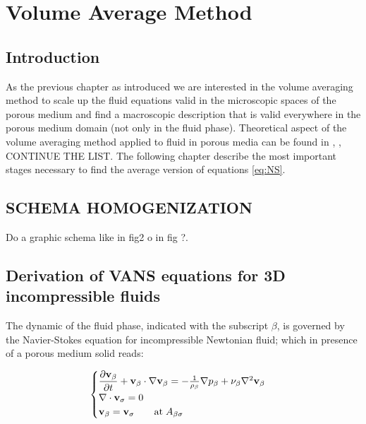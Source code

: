 \chapter{Volume Average Method}
\label{ch:vans}


\section{Introduction}

As the previous chapter as introduced we are interested in the volume averaging method to scale up the fluid equations valid in the microscopic spaces of the porous medium and find a macroscopic description that is valid everywhere in the porous medium domain (not only in the fluid phase).
Theoretical aspect of the volume averaging method applied to fluid in porous media can be found in \citet{whitaker2013method}, \citet{whitaker1986flow}, \citet{whitaker1996forchheimer} CONTINUE THE LIST.
The following chapter describe the most important stages necessary to find the average version of equations \eqref{eq:NS}.

\section{SCHEMA HOMOGENIZATION}
Do a graphic schema like in \citet{paez2017macroscopic} fig2 o in \citet{davit2013homogenization} fig ?.


\section{Derivation of VANS equations for 3D incompressible fluids}
The dynamic of the fluid phase, indicated with the subscript $\beta$, is governed by the Navier-Stokes equation for incompressible Newtonian fluid; which in presence of a porous medium solid reads:

\begin{eqnarray}
	\begin{cases}
		\dfrac{\partial \textbf{v}_{\beta}}{\partial t} + \textbf{v}_{\beta} \cdot \nabla \textbf{v}_{\beta} = -\frac{1}{\rho_{\beta}} \nabla p_{\beta} + \nu_{\beta} \nabla^2  \textbf{v}_{\beta}  \\
		\nabla \cdot \textbf{v}_{\sigma} = 0 \\
		\textbf{v}_{\beta} = \textbf{v}_{\sigma} \qquad \text{at} \; A_{\beta\sigma}
	\end{cases}
\label{eq:NS}
\end{eqnarray}\\

